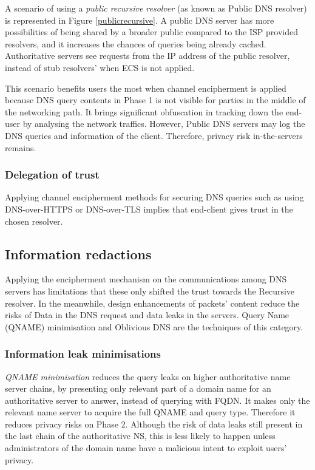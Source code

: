 A scenario of using a \textit{public recursive resolver} (as known as Public DNS resolver) is represented in Figure \ref{publicrecursive}.
A public DNS server has more possibilities of being shared by a broader public compared to the ISP provided resolvers, and it increases the chances of queries being already cached. Authoritative servers see requests from the IP address of the public resolver, instead of stub resolvers' when ECS is not applied.

This scenario benefits users the most when channel encipherment is applied because DNS query contents in Phase 1 is not visible for parties in the middle of the networking path. It brings significant obfuscation in tracking down the end-user by analysing the network traffics. However, Public DNS servers may log the DNS queries and information of the client. Therefore, privacy risk in-the-servers remains.

\subsubsection{Delegation of trust}
Applying channel encipherment methods for securing DNS queries such as using DNS-over-HTTPS or DNS-over-TLS implies that end-client gives trust in the chosen resolver.

\FloatBarrier
\subsection{Information redactions}
Applying the encipherment mechanism on the communications among DNS servers has limitations that these only shifted the trust towards the Recursive resolver.
In the meanwhile, design enhancements of packets' content reduce the risks of Data in the DNS request and data leaks in the servers.
Query Name (QNAME) minimisation \cite{bortzmeyer2016dns} and Oblivious DNS \cite{annee-dprive-oblivious-dns-00} are the techniques of this category.

\subsubsection{Information leak minimisations}
\textit{QNAME minimisation} reduces the query leaks on higher authoritative name server chains, by presenting only relevant part of a domain name for an authoritative server to answer, instead of querying with FQDN.
It makes only the relevant name server to acquire the full QNAME and query type. Therefore it reduces privacy risks on Phase 2.
Although the risk of data leaks still present in the last chain of the authoritative NS, this is less likely to happen unless administrators of the domain name have a malicious intent to exploit users' privacy.

